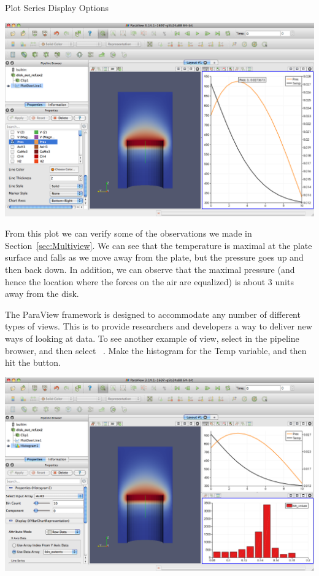 \begin{exercise}{Plot Series Display Options}
  \begin{inlinefig}
    \includegraphics[width=\scw]{images/LinePlot3}
  \end{inlinefig}

  From this plot we can verify some of the observations we made in
  Section~\ref{sec:Multiview}.  We can see that the temperature is maximal
  at the plate surface and falls as we move away from the plate, but the
  pressure goes up and then back down.  In addition, we can observe that
  the maximal pressure (and hence the location where the forces on the air
  are equalized) is about 3 units away from the disk.
\end{exercise}

The ParaView framework is designed to accommodate any number of different
types of views.  This is to provide researchers and developers a way to
deliver new ways of looking at data.  To see another example of view,
select  in the pipeline browser, and then select
 \ra {} \ra {}~\histogram.  Make
the histogram for the Temp variable, and then hit the \apply button.

\begin{inlinefig}
  \includegraphics[width=\scw]{images/HistogramPlot}
\end{inlinefig}


